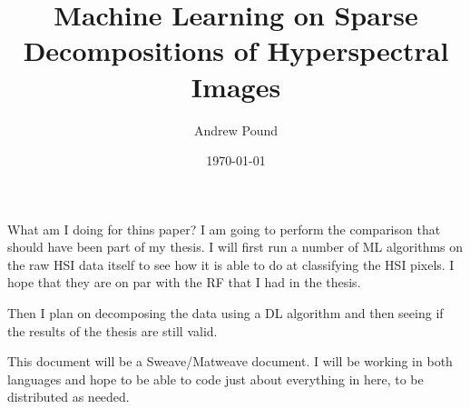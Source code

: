 \documentclass[10pt]{article}
\title{Machine Learning on Sparse Decompositions of Hyperspectral
  Images}
\author{Andrew Pound}
\date{\today}
\begin{document}
\maketitle


What am I doing for thins paper? 
I am going to perform the comparison that should have been part of my
thesis.  I will first run a number of ML algorithms on the raw HSI
data itself to see how it is able to do at classifying the HSI
pixels. I hope that they are on par with the RF that I had in the
thesis. 

Then I plan on decomposing the data using a DL algorithm and then
seeing if the results of the thesis are still valid.

This document will be a Sweave/Matweave document.  I will be working
in both languages and hope to be able to code just about everything in
here, to be distributed as needed.  





% 
% 
\end{document}
